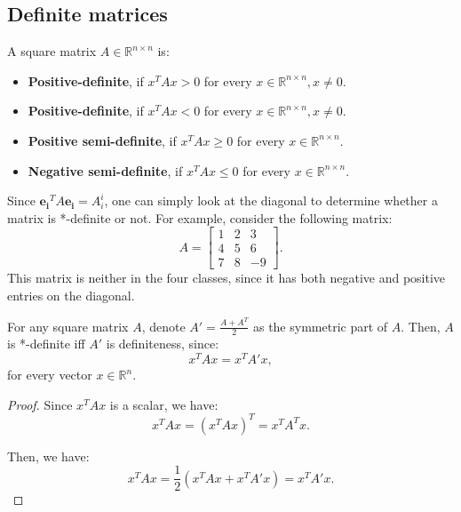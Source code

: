 
\subsection{Definite matrices} %
\label{sub:Definite matrices}

\begin{definition}
\label{def:Definiteness of matrices}
  A square matrix \( A \in \mathbb{R}^{n\times n} \) is:
  \begin{itemize}
  \item \textbf{Positive-definite}, if \( x^{T}Ax > 0 \) for every \( x \in
    \mathbb{R}^{n\times n}, x \neq 0 \).
  \item \textbf{Positive-definite}, if \( x^{T}Ax < 0 \) for every \( x \in
    \mathbb{R}^{n\times n}, x \neq 0 \).
  \item \textbf{Positive semi-definite}, if \( x^{T}Ax \ge 0 \) for every \( x \in
    \mathbb{R}^{n\times n} \).
  \item \textbf{Negative semi-definite}, if \( x^{T}Ax \le 0 \) for every \( x \in
    \mathbb{R}^{n\times n} \).
  \end{itemize}
\end{definition}

Since \( \mathbf{e_{i}}^{T}A\mathbf{e_{i}} = A^{i}_{i} \), one can simply look
at the diagonal to determine whether a matrix is *-definite or not. For
example, consider the following matrix:
\[
  A = \begin{bmatrix} 1 & 2 & 3 \\ 4 & 5 & 6 \\ 7 & 8 & -9 \end{bmatrix} 
.\] This matrix is neither in the four classes, since it has both negative and
positive entries on the diagonal.

\begin{theorem}
\label{thr:Skew-symmetric part does not affect definiteness}
  For any square matrix \( A \), denote \( A' = \frac{A + A^{T}}{2} \) as the
  symmetric part of \( A \). Then, \( A \) is *-definite iff \( A' \) is
  definiteness, since:
  \[
    x^{T}Ax = x^{T}A'x
  ,\] for every vector \( x \in \mathbb{R}^{n} \).
\end{theorem}

\begin{proof}
  Since \( x^{T}Ax \) is a scalar, we have:
  \[
    x^{T}Ax = (x^{T}Ax)^{T} = x^{T}A^{T}x
  .\]

  Then, we have:
  \[
    x^{T}Ax = \frac{1}{2}(x^{T}Ax + x^{T}A'x) = x^{T}A'x
  .\] 
\end{proof}

